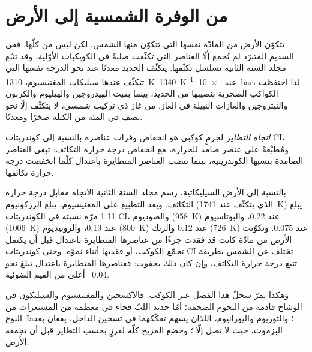 \section{من الوفرة الشمسية إلى الأرض}\label{sec:b3:origin-of-elements:earth}

تتكوّن الأرض من المادّة نفسها التي تتكوّن منها الشمس، لكن ليس من
كلّها. ففي السديم المتبرّد لم تُجمع إلّا العناصر التي تكثّفت صلبةً
في الكويكبات الأوّلية، وقد تتبّع مجلد السنة الثانية تسلسل تكثّفها.
يتكثّف الحديد معدنًا عند
نحو الدرجة نفسها التي تتكثّف عندها سيليكات المغنيسيوم، \qtyrange{1310}{1340}{K} عند
\qty{e-4}{bar}، لذا احتفظت الكواكب الصخرية بنصيبها من الحديد، بينما
بقيت الهيدروجين والهيليوم والكربون والنيتروجين والغازات النبيلة في الغاز.
من غاز ذي تركيب شمسي، لا يتكثّف إلّا نحو نصف في المئة من الكتلة
صخرًا ومعدنًا.

\begin{definition}\label{def:b3:origin-of-elements:volatility}
\emph{اتجاه التطاير} لجرمٍ كوكبي هو انخفاض وفرات عناصره
بالنسبة إلى كوندريتات CI، ومُطبَّعةً على عنصر صامد للحرارة،
مع انخفاض درجة حرارة التكاثف:
تبقى العناصر الصامدة بنسبها الكوندريتية،
بينما تنضب العناصر المتطايرة باعتدال كلّما انخفضت
درجة حرارة تكاثفها.
\end{definition}

بالنسبة إلى الأرض السيليكاتية، رسم مجلد السنة الثانية الاتجاه مقابل
درجة حرارة التكاثف. وبعد التطبيع على المغنيسيوم، يبلغ الزركونيوم
(الذي يتكثّف عند \qty{1741}{K}) يبلغ \num{1.11} مرّة نسبته في الكوندريتات
CI، والصوديوم (\qty{958}{K}) عند \num{0.22}، والبوتاسيوم
(\qty{1006}{K}) عند \num{0.19}، والروبيديوم (\qty{800}{K}) عند \num{0.12}
والزنك (\qty{726}{K}) عند \num{0.075}. وتكوّنت الأرض من مادّة
كانت قد فقدت جزءًا من عناصرها المتطايرة باعتدال قبل أن يكتمل تجمّع الكوكب،
أو فقدتها أثناء نموّه. وحتى كوندريتات CI تختلف عن الشمس
بطريقة تتبع درجة حرارة التكاثف، وإن كان ذلك بخفوت:
فعناصرها المتطايرة باعتدال تبلغ
نحو \num{0.04}~ أعلى من القيم الضوئية.

وهكذا يمرّ سجلّ هذا الفصل عبر الكوكب. فالأكسجين
والمغنيسيوم والسيليكون في الوشاح  قادمة من النجوم
الضخمة؛ أمّا حديد اللبّ فجاء في معظمه من المستعرات من النوع~Ia؛
والثوريوم واليورانيوم، اللذان يسهم تفكّكهما في تسخين الداخل، يقعان بعد
البزموث، حيث لا تصل إلّا ؛ وخضع المزيج كلّه
لفرزٍ بحسب التطاير قبل أن تجمعه الأرض.

